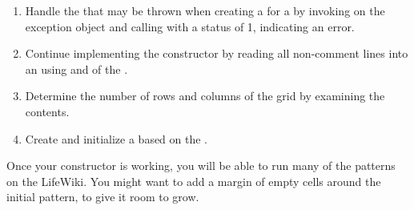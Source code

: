 \begin{exercise}
\begin{enumerate}
\item Handle the  that may be thrown when creating a  for a  by invoking  on the exception object and calling  with a status of 1, indicating an error.

\item Continue implementing the constructor by reading all non-comment lines into an  using  and  of the .

\item Determine the number of rows and columns of the grid by examining the  contents.

\item Create and initialize a  based on the .

\end{enumerate}

Once your constructor is working, you will be able to run many of the patterns on the LifeWiki.
You might want to add a margin of empty cells around the initial pattern, to give it room to grow.

\end{exercise}


